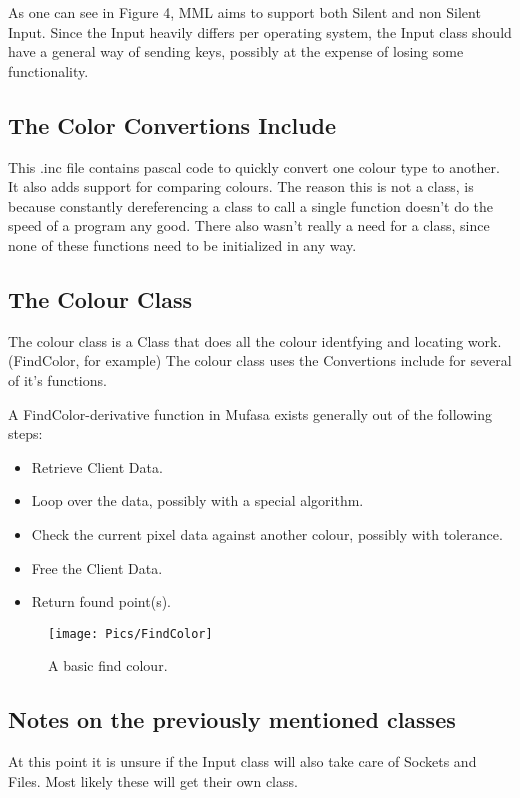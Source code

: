 \documentclass[a4paper, 10pt]{article}
\begin{document}
As one can see in Figure 4, MML aims to support both Silent and non Silent Input.
Since the Input heavily differs per operating system, the Input class should have a general way of sending keys, possibly at the expense of losing some functionality.

\subsection{The Color Convertions Include}

This .inc file contains pascal code to quickly convert one colour type to another.
It also adds support for comparing colours. The reason this is not a class, is because constantly dereferencing a class to call a single function doesn't do the speed of a program any good. There also wasn't really a need for a class, since none of these functions need to be initialized in any way.

\subsection{The Colour Class}

The colour class is a Class that does all the colour identfying and locating work. (FindColor, for example)
The colour class uses the Convertions include for several of it's functions.

A FindColor-derivative function in Mufasa exists generally out of the following steps:
\begin{itemize}
	\item Retrieve Client Data.
	\item Loop over the data, possibly with a special algorithm.
	\item Check the current pixel data against another colour, possibly with tolerance.
	\item Free the Client Data.
	\item Return found point(s).
\end{itemize}

\begin{figure}[h]
    \texttt{[image: Pics/FindColor]}
    \caption{A basic find colour.}
\end{figure}

\subsection{Notes on the previously mentioned classes}

At this point it is unsure if the Input class will also take care of Sockets and Files. Most likely these will get their own class.
\end{document}
